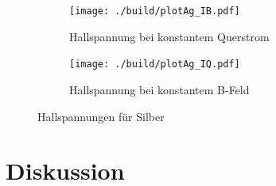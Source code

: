 \begin{figure}[H]
\begin{subfigure}{0.495\linewidth}
\centering
\texttt{[image: ./build/plotAg\_IB.pdf]}
\caption{Hallspannung bei konstantem Querstrom}
\end{subfigure}
\begin{subfigure}{0.495\linewidth}
\centering
\texttt{[image: ./build/plotAg\_IQ.pdf]}
\caption{Hallspannung bei konstantem B-Feld}
\end{subfigure}
\caption{Hallspannungen für Silber}
\end{figure}





\section{Diskussion}



\newpage
\printbibliography

